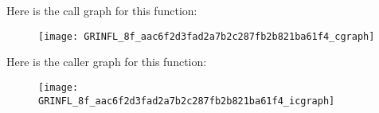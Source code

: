 Here is the call graph for this function\+:\nopagebreak
\begin{figure}[H]
\begin{center}
\leavevmode
\texttt{[image: GRINFL\_8f\_aac6f2d3fad2a7b2c287fb2b821ba61f4\_cgraph]}
\end{center}
\end{figure}




Here is the caller graph for this function\+:\nopagebreak
\begin{figure}[H]
\begin{center}
\leavevmode
\texttt{[image: GRINFL\_8f\_aac6f2d3fad2a7b2c287fb2b821ba61f4\_icgraph]}
\end{center}
\end{figure}



